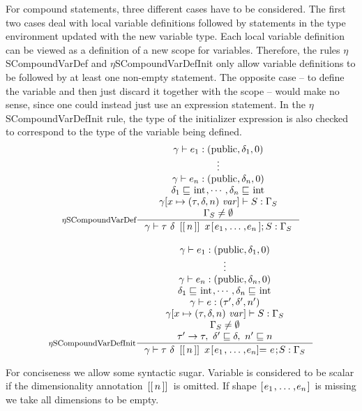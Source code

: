 \documentclass[a4paper, 10pt, draft]{report}
\newcommand{\mycode}[1]{\ensuremath{\mbox{\lstinline{#1}}}}
\begin{document}
For compound statements, three different cases have to be considered. The first
two cases deal with local variable definitions followed by statements in the
type environment updated with the new variable type. Each local variable
definition can be viewed as a definition of a new scope for variables.
Therefore, the rules $\eta$SCompoundVarDef and $\eta$SCompoundVarDefInit only
allow variable definitions to be followed by at least one non-empty statement.
The opposite case -- to define the variable and then just discard it together
with the scope -- would make no sense, since one could instead just use an
expression statement. In the $\eta$SCompoundVarDefInit rule, the type of the
initializer expression is also checked to correspond to the type of the
variable being defined.
\[\begin{array}{c}
\inference[$\eta$SCompoundVarDef]{
  \gamma |- e_1 : \left( \mycode{public}, \delta_1, 0 \right)\\
  \vdots \\
  \gamma |- e_n : \left( \mycode{public}, \delta_n, 0 \right)\\
  \delta_1 \sqsubseteq \mycode{int}, \cdots, \delta_n \sqsubseteq \mycode{int}\\
  \gamma[x \mapsto (\tau, \delta, n)\ \mathit{var}] |- S : \Gamma_S \\
  \Gamma_S \neq \emptyset
}{
  \gamma |- \tau\ \delta\ \mycode{[[}n\mycode{]]}\ x\mycode{[} e_1 \mycode{,} \ldots \mycode{,} e_n \mycode{];} S : \Gamma_S
} \\[2em]
\inference[$\eta$SCompoundVarDefInit]{
  \gamma |- e_1 : \left( \mycode{public}, \delta_1, 0 \right) \\
  \vdots \\
  \gamma |- e_n : \left( \mycode{public}, \delta_n, 0 \right) \\
  \delta_1 \sqsubseteq \mycode{int}, \cdots, \delta_n \sqsubseteq \mycode{int}\\
  \gamma |- e : \left( \tau', \delta', n' \right) \\
  \gamma[x \mapsto (\tau, \delta, n)\ \mathit{var}] |- S : \Gamma_S \\
  \Gamma_S \neq \emptyset \\
  \tau' \to \tau,\ \delta' \sqsubseteq \delta,\ n' \sqsubseteq n
}{
  \gamma |- \tau\ \delta\ \mycode{[[}n\mycode{]]}\ x\mycode{[} e_1 \mycode{,} \ldots \mycode{,} e_n  \mycode{]=}\ e\mycode{;} S : \Gamma_S
}
\end{array}\]

For conciseness we allow some syntactic sugar. Variable is considered to be
scalar if the dimensionality annotation $\mycode{[[}n\mycode{]]}$ is omitted.
If shape $\mycode{[} e_1 \mycode{,} \ldots \mycode{,} e_n  \mycode{]}$ is
missing we take all dimensions to be empty.
\end{document}
